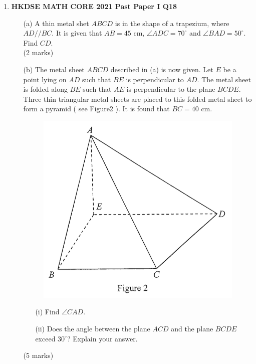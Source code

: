 \documentclass[12pt]{article}
\begin{document}
\begin{enumerate}
	\item \textbf{HKDSE MATH CORE 2021 Past Paper I Q18}
	\begin{enumerate}
		\item[(a)] A thin metal shet $ABCD$ is in the shape of a trapezium, where $AD // BC$. It is given that $AB = 45$ cm, $\angle ADC = 70^\circ$ and $\angle BAD = 50^\circ$. Find $CD$. \\(2 marks)
		\item[(b)] The metal sheet $ABCD$ described in (a) is now given. Let $E$ be a point lying on $AD$ such that $BE$ is perpendicular to $AD$. The metal sheet is folded along $BE$ such that $AE$ is perpendicular to the plane $BCDE$. Three thin triangular metal sheets are placed to this folded metal sheet to form a pyramid ( see Figure2 ). It is found that $BC = 40$ cm.
		\begin{figure}[H]
			\centering
			\includegraphics[width = .3\linewidth]{2021Figure1.2}
		\end{figure}
		\begin{enumerate}
			\item[(i)] Find $\angle CAD$.
			\item[(ii)] Does the angle between the plane $ACD$ and the plane $BCDE$ exceed $30^\circ$? Explain your answer.
		\end{enumerate}
		(5 marks)
	\end{enumerate}


\end{enumerate}
\end{document}
